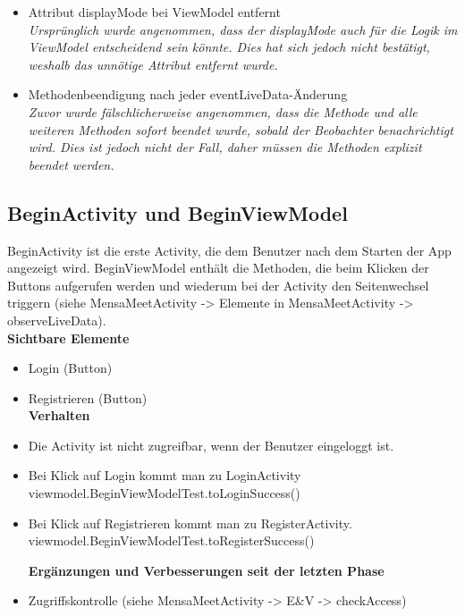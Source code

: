 \documentclass[a4paper]{scrreprt}
\begin{document}
\begin{itemize}
\item Attribut displayMode bei ViewModel entfernt\\
\textit{Ursprünglich wurde angenommen, dass der displayMode auch für die Logik im ViewModel entscheidend sein könnte. Dies hat sich jedoch nicht bestätigt, weshalb das unnötige Attribut entfernt wurde.}
\item Methodenbeendigung nach jeder eventLiveData-Änderung \\
\textit{Zuvor wurde fälschlicherweise angenommen, dass die Methode und alle weiteren Methoden sofort beendet wurde, sobald der Beobachter benachrichtigt wird. Dies ist jedoch nicht der Fall, daher müssen die Methoden explizit beendet werden.}
\end{itemize}

\subsection{BeginActivity und BeginViewModel}
BeginActivity ist die erste Activity, die dem Benutzer nach dem Starten der App angezeigt wird. BeginViewModel enthält die Methoden, die beim Klicken der Buttons aufgerufen werden und wiederum bei der Activity den Seitenwechsel triggern (siehe MensaMeetActivity -> Elemente in MensaMeetActivity -> observeLiveData). \\

\textbf{Sichtbare Elemente} \\
\begin{itemize}
\item Login (Button)
\item Registrieren (Button) \\

\textbf{Verhalten} \\
\item Die Activity ist nicht zugreifbar, wenn der Benutzer eingeloggt ist. 
\item Bei Klick auf Login kommt man zu LoginActivity \\
viewmodel.BeginViewModelTest.toLoginSuccess()
\item Bei Klick auf Registrieren kommt man zu RegisterActivity. \\
viewmodel.BeginViewModelTest.toRegisterSuccess()

\textbf{Ergänzungen und Verbesserungen seit der letzten Phase} \\
\item Zugriffskontrolle (siehe MensaMeetActivity -> E\&V -> checkAccess)
\end{itemize}
\end{document}
